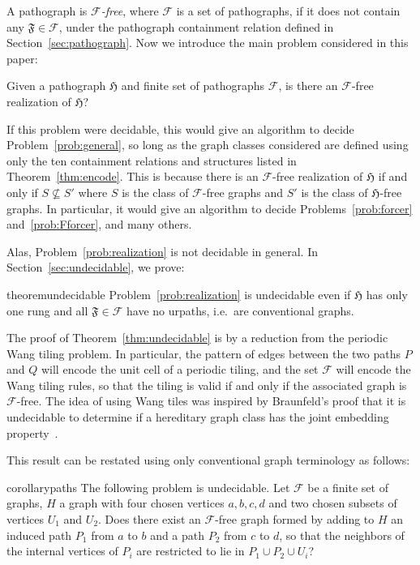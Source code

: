 \documentclass{article}
\newcommand{\Fc}{\mathcal{F}}
\newcommand{\Ff}{\mathfrak{F}}
\newcommand{\Hf}{\mathfrak{H}}
\begin{document}
A pathograph is \textit{$\Fc$-free}, where $\Fc$ is a set of pathographs, if it does not contain any $\Ff\in\Fc$, under the pathograph containment relation defined in Section~\ref{sec:pathograph}. Now we introduce the main problem considered in this paper:

\begin{problem}\label{prob:realization}
Given a pathograph $\Hf$ and finite set of pathographs $\Fc$, is there an $\Fc$-free realization of $\Hf$?
\end{problem}

If this problem were decidable, this would give an algorithm to decide Problem~\ref{prob:general}, so long as the graph classes considered are defined using only the ten containment relations and structures listed in Theorem~\ref{thm:encode}. This is because there is an $\Fc$-free realization of $\Hf$ if and only if $S\not\subseteq S'$ where $S$ is the class of $\Fc$-free graphs and $S'$ is the class of $\Hf$-free graphs. In particular, it would give an algorithm to decide Problems~\ref{prob:forcer} and~\ref{prob:Fforcer}, and many others.

Alas, Problem~\ref{prob:realization} is not decidable in general. In Section~\ref{sec:undecidable}, we prove:

\begin{restatable}{theorem}{undecidable}\label{thm:undecidable}
Problem~\ref{prob:realization} is undecidable even if $\Hf$ has only one rung and all $\Ff\in\Fc$ have no urpaths, i.e.\ are conventional graphs.
\end{restatable}

The proof of Theorem~\ref{thm:undecidable} is by a reduction from the periodic Wang tiling problem. In particular, the pattern of edges between the two paths $P$ and $Q$ will encode the unit cell of a periodic tiling, and the set $\Fc$ will encode the Wang tiling rules, so that the tiling is valid if and only if the associated graph is $\Fc$-free. The idea of using Wang tiles was inspired by Braunfeld's proof that it is undecidable to determine if a hereditary graph class has the joint embedding property~\cite{braunfeld}.

This result can be restated using only conventional graph terminology as follows:
\begin{restatable}{corollary}{paths}\label{cor:paths}
The following problem is undecidable. Let $\Fc$ be a finite set of graphs, $H$ a graph with four chosen vertices $a,b,c,d$ and two chosen subsets of vertices $U_1$ and $U_2$. Does there exist an $\Fc$-free graph formed by adding to $H$ an induced path $P_1$ from $a$ to $b$ and a path $P_2$ from $c$ to $d$, so that the neighbors of the internal vertices of $P_i$ are restricted to lie in $P_1\cup P_2\cup U_i$?
\end{restatable}
\end{document}
